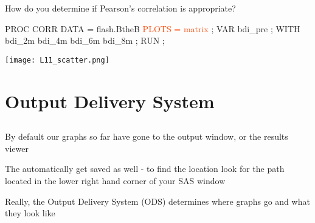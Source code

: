 \begin{frame}[fragile]
How do you determine if Pearson's correlation is appropriate?
\vskip10pt
\hspace*{-0.2in}
\footnotesize
\begin{code}{.0}
PROC CORR DATA = flash.BtheB \textcolor{OrangeRed}{PLOTS = matrix} ;
   VAR bdi_pre ;
   WITH bdi_2m bdi_4m bdi_6m bdi_8m ;
RUN ;
\end{code}
\emp
{} \hspace{1in} \emp
{}
\texttt{[image: L11\_scatter.png]}
\emp
\end{frame}


\section[Output Delivery System]{Output Delivery System}
\subsection{}
\begin{frame}
\end{frame}

\begin{frame}
\bi
\item By default our graphs so far have gone to the output window, or the results viewer
\item The  automatically get saved as well - to find the location look for the path located in the lower right hand corner of your SAS window
\item Really, the Output Delivery System (ODS) determines where graphs go and what they look like
\ei
\end{frame}


